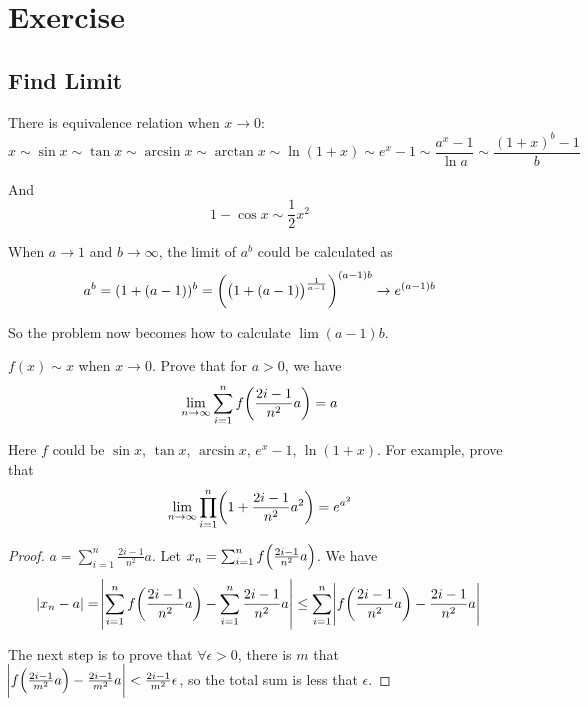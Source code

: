 \chapter{Exercise}


\section{Find Limit}

\begin{theorem}
    There is equivalence relation when $x \rightarrow 0$:
    \begin{equation}
        x \sim \sin x \sim \tan x \sim \arcsin x \sim \arctan x \sim \ln (1+x) \sim e^x -1 \sim \frac{a^x - 1}{\ln a} \sim \frac{(1+x)^b -1}{b}
    \end{equation}
    
    And 
    \begin{equation}
        1 - \cos x \sim \frac{1}{2} x^2
    \end{equation}
\end{theorem}

\begin{example}
    When $a \rightarrow 1$ and $b \rightarrow \infty$, the limit of $a^b$ could be calculated as
    \begin{equation}
        a^b = (1 + (a-1))^b = \mleft(\mleft(1 + (a-1)\mright)^{\frac{1}{a-1}}\mright)^{(a-1)b} \rightarrow e^{(a-1)b}
    \end{equation}
    
    So the problem now becomes how to calculate $\lim (a-1)b$.
\end{example}


\begin{theorem}
    $f(x) \sim x$ when $x \rightarrow 0$. Prove that for $a > 0$, we have
    \begin{equation}
        \lim_{n \rightarrow \infty} \sum_{i=1}^n f\mleft ( \frac{2i-1}{n^2} a \mright ) = a
    \end{equation}
    
    Here $f$ could be $\sin x$, $\tan x$, $\arcsin x$, $e^x -1$, $\ln (1+x)$. For example, prove that
    \begin{equation}
        \lim_{n \rightarrow \infty} \prod_{i=1}^n \mleft( 1 + \frac{2i-1}{n^2} a^2 \mright) = e^{a^2}
    \end{equation}
\end{theorem}
\begin{proof}
    $a = \sum_{i=1}^n \frac{2i-1}{n^2} a$. Let $x_n = \sum_{i=1}^n f\mleft( \frac{2i-1}{n^2} a \mright)$. We have
    \begin{equation*}
        \absolutevalue{x_n - a} = \absolutevalue{ \sum_{i=1}^n f\mleft( \frac{2i-1}{n^2} a \mright) - \sum_{i=1}^n \frac{2i-1}{n^2} a} \leq \sum_{i=1}^n \absolutevalue{ f\mleft( \frac{2i-1}{n^2} a \mright) - \frac{2i-1}{n^2} a}
    \end{equation*}
    
    The next step is to prove that $\forall \epsilon > 0$, there is $m$ that $\absolutevalue{ f\mleft( \frac{2i-1}{m^2} a \mright) - \frac{2i-1}{m^2} a} < \frac{2i-1}{m^2} \epsilon$, so the total sum is less that $\epsilon$.
\end{proof}

